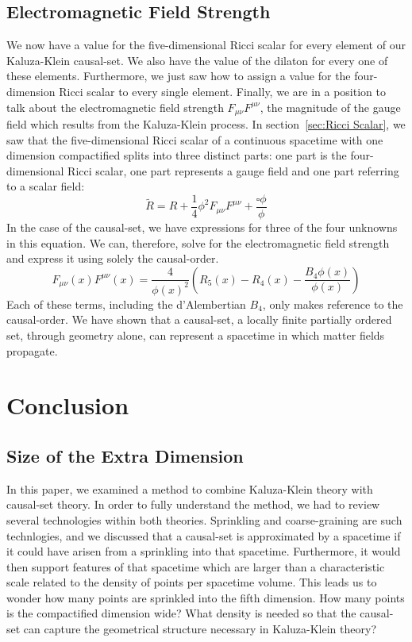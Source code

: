 \documentclass[a4paper,12pt]{article}
\numberwithin{equation}{section}
\begin{document}
\subsection{Electromagnetic Field Strength}
\label{sec:Electromagnetic Field Strength}

We now have a value for the five-dimensional Ricci scalar for every element of our Kaluza-Klein causal-set. We also have the value of the dilaton for every one of these elements. Furthermore, we just saw how to assign a value for the four-dimension Ricci scalar to every single element. Finally, we are in a position to talk about the electromagnetic field strength $F_{\mu \nu } F^{\mu \nu}$, the magnitude of the gauge field which results from the Kaluza-Klein process. In section~\ref{sec:Ricci Scalar}, we saw that the five-dimensional Ricci scalar of a continuous spacetime with one dimension compactified splits into three distinct parts: one part is the four-dimensional Ricci scalar, one part represents a gauge field and one part referring to a scalar field:
\begin{equation}
\label{eq:Four-dimensional Ricci scalar}
\tilde{R}=R+\frac{1}{4} \phi^2 F_{\mu \nu } F^{\mu \nu}+\frac{\square \phi}{\phi}
\end{equation}
In the case of the causal-set, we have expressions for three of the four unknowns in this equation. We can, therefore, solve for the electromagnetic field strength and express it using solely the causal-order.
\begin{equation}
\label{eq:Four-dimensional Ricci scalar}
F_{\mu \nu }(x) F^{\mu \nu}(x)=\frac{4}{\phi(x)^2} \left( R_5(x)-R_4(x)-\frac{B_4 \phi(x)}{\phi(x)} \right)
\end{equation}
Each of these terms, including the d'Alembertian $B_4$, only makes reference to the causal-order. We have shown that a causal-set, a locally finite partially ordered set, through geometry alone, can represent a spacetime in which matter fields propagate.


\section{Conclusion}
\label{sec:Conclusion}
\subsection{Size of the Extra Dimension}
\label{sec:Size of the Extra Dimension}

In this paper, we examined a method to combine Kaluza-Klein theory with causal-set theory. In order to fully understand the method, we had to review several technologies within both theories. Sprinkling and coarse-graining are such technlogies, and we discussed that a causal-set is approximated by a spacetime if it could have arisen from a sprinkling into that spacetime. Furthermore, it would then support features of that spacetime which are larger than a characteristic scale related to the density of points per spacetime volume. This leads us to wonder how many points are sprinkled into the fifth dimension. How many points is the compactified dimension wide? What density is needed so that the causal-set can capture the geometrical structure necessary in Kaluza-Klein theory?
\end{document}
